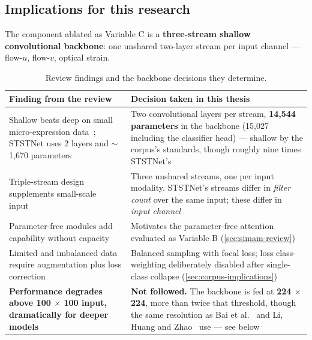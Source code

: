 \subsection{Implications for this research}
\label{sec:cnn-implications}

The component ablated as Variable C is a \textbf{three-stream shallow convolutional backbone}: one unshared two-layer stream per input channel --- flow-$u$, flow-$v$, optical strain.

\begin{table}[htbp]
	\centering
	\footnotesize
	\begin{tabular}{@{}p{5.6cm} p{8.0cm}@{}}
		\hline
		\textbf{Finding from the review} & \textbf{Decision taken in this thesis} \\
		\hline
		Shallow beats deep on small micro-expression data~\cite{xia2020b}; STSTNet uses 2 layers and $\sim$1,670 parameters~\cite{liong2019b} & Two convolutional layers per stream, \textbf{14,544 parameters} in the backbone (15,027 including the classifier head) --- shallow by the corpus's standards, though roughly nine times STSTNet's \\
		Triple-stream design supplements small-scale input~\cite{liong2019b} & Three unshared streams, one per input modality. STSTNet's streams differ in \textit{filter count} over the same input; these differ in \textit{input channel} \\
		Parameter-free modules add capability without capacity~\cite{xia2020b} & Motivates the parameter-free attention evaluated as Variable B (\autoref{sec:simam-review}) \\
		Limited and imbalanced data require augmentation plus loss correction~\cite{xia2020a} & Balanced sampling with focal loss; loss class-weighting deliberately disabled after single-class collapse (\autoref{sec:corpus-implications}) \\
		\textbf{Performance degrades above 100 $\times$ 100 input, dramatically for deeper models~\cite{xia2020b}} & \textbf{Not followed.} The backbone is fed at \textbf{224 $\times$ 224}, more than twice that threshold, though the same resolution as Bai et al.~\cite{bai2021} and Li, Huang and Zhao~\cite{liY2021} use --- see below \\
		\hline
	\end{tabular}
	\caption[Review findings and the backbone decisions they determine]{Review findings and the backbone decisions they determine.}
	\label{tab:cnn-decisions}
\end{table}

